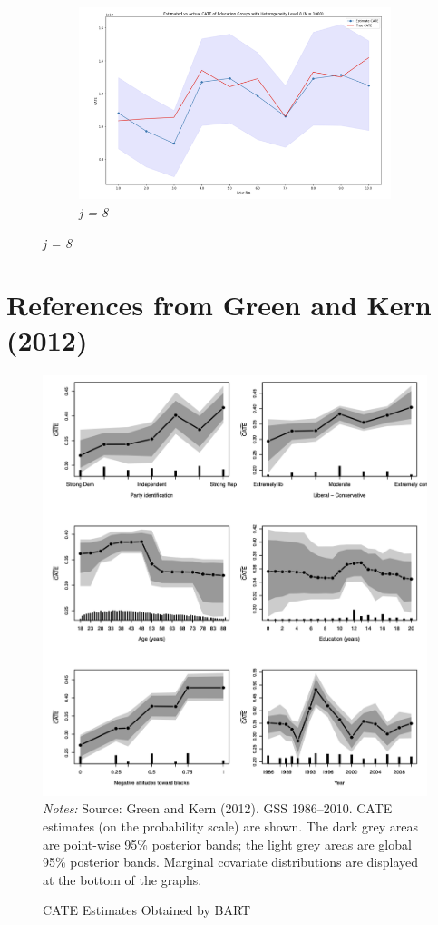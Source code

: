 \documentclass[12pt]{article}
\begin{document}
\begin{figure}[!htp]
\begin{subfigure} [h] {0.49\linewidth}
	\end{subfigure}
	\begin{subfigure} [h] {0.49\linewidth}
	\vspace{0.5cm}
		\caption{\textit{j = 8}}
   	 	\includegraphics[width = \linewidth]{Graphs/s2_CATEhet8.png}
	\end{subfigure}
\end{figure} 



\clearpage




\clearpage
\appendix
\section{References from Green and Kern (2012) }

\begin{figure}[!ht]
\renewcommand{\thefigure}{A1}
\caption{\label{figure:GK}CATE Estimates Obtained by BART}
	\centering
   	 	\includegraphics[width = 0.6\linewidth]{Graphs/A_GK_cate.png} \\
\footnotesize
\emph{Notes:} Source: Green and Kern (2012). GSS 1986–2010. CATE estimates (on the probability scale) are shown. The dark grey areas are point-wise 95\% posterior bands; the light grey areas are global 95\% posterior bands. Marginal covariate distributions are displayed at the bottom of the graphs.
\end{figure} 
\end{document}
